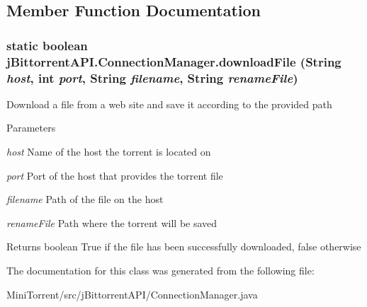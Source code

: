 \subsection{Member Function Documentation}
\hypertarget{classj_bittorrent_a_p_i_1_1_connection_manager_adaa7d85013828269c09037be26f8ea2e}{
\subsubsection[{downloadFile}]{\setlength{\rightskip}{0pt plus 5cm}static boolean jBittorrentAPI.ConnectionManager.downloadFile (String {\em host}, \/  int {\em port}, \/  String {\em filename}, \/  String {\em renameFile})}}
\label{classj_bittorrent_a_p_i_1_1_connection_manager_adaa7d85013828269c09037be26f8ea2e}
Download a file from a web site and save it according to the provided path 
\begin{DoxyParams}{Parameters}
\item[{\em host}]Name of the host the torrent is located on \item[{\em port}]Port of the host that provides the torrent file \item[{\em filename}]Path of the file on the host \item[{\em renameFile}]Path where the torrent will be saved \end{DoxyParams}
\begin{DoxyReturn}{Returns}
boolean True if the file has been successfully downloaded, false otherwise 
\end{DoxyReturn}


The documentation for this class was generated from the following file:\begin{DoxyCompactItemize}
\item 
MiniTorrent/src/jBittorrentAPI/ConnectionManager.java\end{DoxyCompactItemize}
